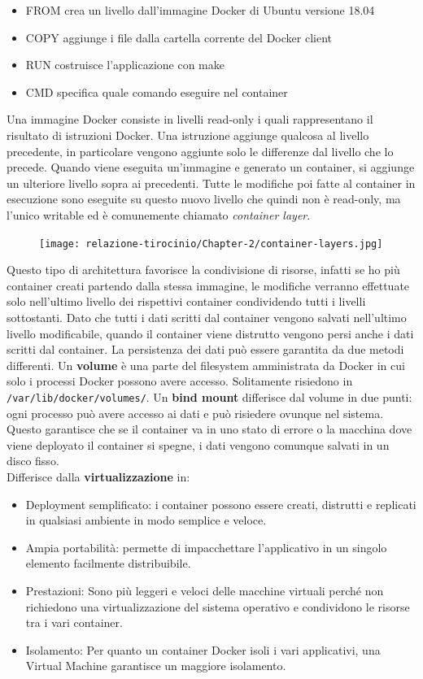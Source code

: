 \documentclass[a4paper,10pt]{memoir}
\begin{document}
\begin{itemize}
    \item FROM crea un livello dall'immagine Docker di Ubuntu versione 18.04
    \item COPY aggiunge i file dalla cartella corrente del Docker client
    \item RUN costruisce l'applicazione con make
    \item CMD specifica quale comando eseguire nel container
\end{itemize}
Una immagine Docker consiste in livelli read-only i quali rappresentano il risultato di istruzioni Docker. Una istruzione aggiunge qualcosa al livello precedente, in particolare vengono aggiunte solo le differenze dal livello che lo precede.
Quando viene eseguita un'immagine e generato un container, si aggiunge un ulteriore livello sopra ai precedenti.
Tutte le modifiche poi fatte al container in esecuzione sono eseguite su questo nuovo livello che quindi non è read-only, ma l'unico writable ed è comunemente chiamato \textit{container layer}.
\begin{figure}[ht]
\texttt{[image: relazione-tirocinio/Chapter-2/container-layers.jpg]}
\end{figure}
Questo tipo di architettura favorisce la condivisione di risorse, infatti se ho più container creati partendo dalla stessa immagine, le modifiche verranno effettuate solo nell'ultimo livello dei rispettivi container condividendo tutti i livelli sottostanti\cite{aboutstoragedrivers}.
Dato che tutti i dati scritti dal container vengono salvati nell'ultimo livello modificabile, quando il container viene distrutto vengono persi anche i dati scritti dal container.
La persistenza dei dati può essere garantita da due metodi differenti.
Un \textbf{volume} è una parte del filesystem amministrata da Docker in cui solo i processi Docker possono avere accesso. Solitamente risiedono in \texttt{/var/lib/docker/volumes/}.
Un \textbf{bind mount} differisce dal volume in due punti: ogni processo può avere accesso ai dati e può risiedere ovunque nel sistema. 
Questo garantisce che se il container va in uno stato di errore o la macchina dove viene deployato il container si spegne, i dati vengono comunque salvati in un disco fisso.
\\
Differisce dalla \textbf{virtualizzazione} \cite{dockervsvm2} in:

\begin{itemize}
    \item Deployment semplificato: i container possono essere creati, distrutti e replicati in qualsiasi ambiente in modo semplice e veloce.
    \item Ampia portabilità: permette di impacchettare l'applicativo in un singolo elemento facilmente distribuibile.
    \item Prestazioni: Sono più leggeri e veloci delle macchine virtuali perché non richiedono una virtualizzazione del sistema operativo e condividono le risorse tra i vari container.
    \item Isolamento: Per quanto un container Docker isoli i vari applicativi, una Virtual Machine garantisce un maggiore isolamento.
\end{itemize}
\end{document}
